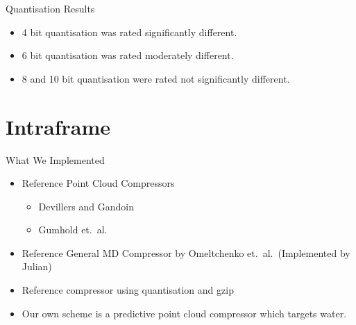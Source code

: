 \documentclass{beamer}
\begin{document}
\begin{frame}{Quantisation Results}
\begin{itemize}

  \item 4 bit quantisation was rated significantly different.

  \item 6 bit quantisation was rated moderately different.

  \item 8 and 10 bit quantisation were rated not significantly different.

\end{itemize}
\end{frame}


\section{Intraframe}
\begin{frame}{What We Implemented}
  \begin{itemize}
    \item Reference Point Cloud Compressors
      \begin{itemize}
        \item Devillers and Gandoin
        \item Gumhold et.~al.
      \end{itemize}
    \item Reference General MD Compressor by Omeltchenko et.~al.~(Implemented
      by Julian)
    \item Reference compressor using quantisation and gzip
    \item Our own scheme is a predictive point cloud compressor which targets
      water.
  \end{itemize}
\end{frame}
\end{document}
